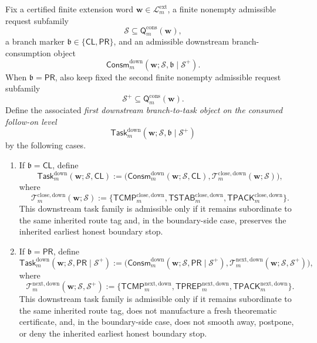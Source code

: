 \begin{definition}
\label{def:first-downstream-branch-to-task-object-on-the-consumed-follow-on-level}
Fix a certified finite extension word \(\mathbf w\in\mathcal L^{\mathrm{ext}}_{m}\), a finite nonempty admissible request subfamily
\[
  \mathcal S \subseteq \mathsf{Q}^{\mathrm{cons}}_{m}(\mathbf w),
\]
a branch marker \(\mathfrak b\in\{\mathsf{CL},\mathsf{PR}\}\), and an admissible downstream branch-consumption object
\[
  \mathsf{Consm}^{\mathrm{down}}_{m}(\mathbf w;\mathcal S,\mathfrak b\mid\mathcal S^{+}).
\]
When \(\mathfrak b=\mathsf{PR}\), also keep fixed the second finite nonempty admissible request subfamily
\[
  \mathcal S^{+}\subseteq \mathsf{Q}^{\mathrm{cons}}_{m}(\mathbf w).
\]
Define the associated \emph{first downstream branch-to-task object on the consumed follow-on level}
\[
  \mathsf{Task}^{\mathrm{down}}_{m}(\mathbf w;\mathcal S,\mathfrak b\mid\mathcal S^{+})
\]
by the following cases.
\begin{enumerate}[label=(\roman*)]
  \item If \(\mathfrak b=\mathsf{CL}\), define
\[
  \mathsf{Task}^{\mathrm{down}}_{m}(\mathbf w;\mathcal S,\mathsf{CL})
  :=
  \bigl(\mathsf{Consm}^{\mathrm{down}}_{m}(\mathbf w;\mathcal S,\mathsf{CL}),\mathcal T^{\mathrm{close,down}}_{m}(\mathbf w;\mathcal S)\bigr),
\]
where
\[
  \mathcal T^{\mathrm{close,down}}_{m}(\mathbf w;\mathcal S)
  :=
  \{\mathsf{TCMP}^{\mathrm{close,down}}_{m},\mathsf{TSTAB}^{\mathrm{close,down}}_{m},\mathsf{TPACK}^{\mathrm{close,down}}_{m}\}.
\]
This downstream task family is admissible only if it remains subordinate to the same inherited route tag and, in the boundary-side case, preserves the inherited earliest honest boundary stop.

  \item If \(\mathfrak b=\mathsf{PR}\), define
\[
  \mathsf{Task}^{\mathrm{down}}_{m}(\mathbf w;\mathcal S,\mathsf{PR}\mid\mathcal S^{+})
  :=
  \bigl(\mathsf{Consm}^{\mathrm{down}}_{m}(\mathbf w;\mathcal S,\mathsf{PR}\mid\mathcal S^{+}),\mathcal T^{\mathrm{next,down}}_{m}(\mathbf w;\mathcal S,\mathcal S^{+})\bigr),
\]
where
\[
  \mathcal T^{\mathrm{next,down}}_{m}(\mathbf w;\mathcal S,\mathcal S^{+})
  :=
  \{\mathsf{TCMP}^{\mathrm{next,down}}_{m},\mathsf{TPREP}^{\mathrm{next,down}}_{m},\mathsf{TPACK}^{\mathrm{next,down}}_{m}\}.
\]
This downstream task family is admissible only if it remains subordinate to the same inherited route tag, does not manufacture a fresh theorematic certificate, and, in the boundary-side case, does not smooth away, postpone, or deny the inherited earliest honest boundary stop.
\end{enumerate}
\end{definition}

